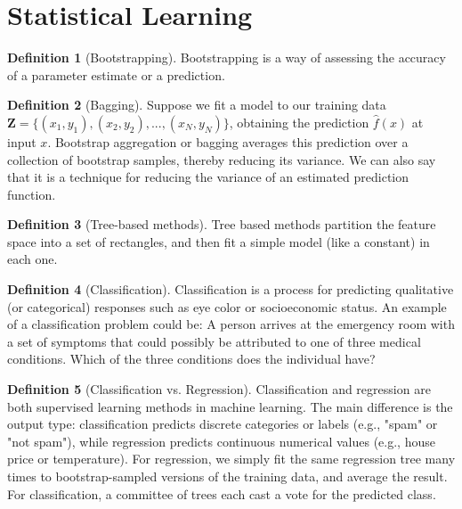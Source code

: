 \documentclass{article}
\theoremstyle{definition}
\newtheorem{definition}{Definition}
\theoremstyle{Solution}
\begin{document}

\section{Statistical Learning}

\begin{definition}[Bootstrapping]
Bootstrapping is a way of assessing the accuracy of a parameter estimate or a prediction.
\end{definition}

\begin{definition}[Bagging]
Suppose we fit a model to our training data $\mathbf{Z}=\{(x_1,y_1),(x_2,y_2),...,(x_N,y_N)\}$, obtaining the prediction $\hat{f}(x)$ at input $x$. Bootstrap aggregation or bagging averages this prediction over a collection of bootstrap samples, thereby reducing its variance. We can also say that it is a technique for reducing the variance of an estimated prediction function.
\end{definition}

\begin{definition}[Tree-based methods]
Tree based methods partition the feature space into a set of rectangles, and then fit a simple model (like a constant) in each one.
\end{definition}

\begin{definition}[Classification]
Classification is a process for predicting qualitative (or categorical) responses such as eye color or socioeconomic status. An example of a classification problem could be: A person arrives at the emergency room with a set of symptoms that could possibly be attributed to one of three medical conditions. Which of the three conditions does the individual have?
\end{definition}

\begin{definition}[Classification vs. Regression]
Classification and regression are both supervised learning methods in machine learning. The main difference is the output type: classification predicts discrete categories or labels (e.g., "spam" or "not spam"),  while regression predicts continuous numerical values (e.g., house price or temperature). For regression, we simply fit the same regression tree many times to bootstrap-sampled versions of the training data, and average the result. For classification, a committee of trees each cast a vote for the predicted class.
\end{definition}
\end{document}

